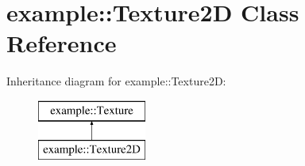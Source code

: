 \hypertarget{classexample_1_1_texture2_d}{}\section{example\+::Texture2D Class Reference}
\label{classexample_1_1_texture2_d}
Inheritance diagram for example\+::Texture2D\+:\begin{figure}[H]
\begin{center}
\leavevmode
\includegraphics[height=2.000000cm]{classexample_1_1_texture2_d}
\end{center}
\end{figure}
